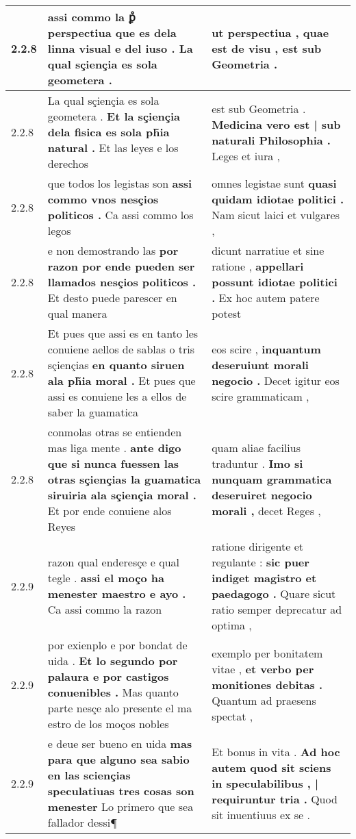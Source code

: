 \begin{tabular}{|p{1cm}|p{6.5cm}|p{6.5cm}|}
2.2.8 & assi commo la ꝑ̊ perspectiua \textbf{ que es dela linna visual e del iuso . } La qual sçiençia es sola geometera . & ut perspectiua , \textbf{ quae est de visu , } est sub Geometria . \\\hline
2.2.8 & La qual sçiençia es sola geometera . \textbf{ Et la sçiençia dela fisica es sola ph̃ia natural . } Et las leyes e los derechos & est sub Geometria . \textbf{ Medicina vero est | sub naturali Philosophia . } Leges et iura , \\\hline
2.2.8 & que todos los legistas son \textbf{ assi commo vnos nesçios politicos . } Ca assi commo los legos & omnes legistae sunt \textbf{ quasi quidam idiotae politici . } Nam sicut laici et vulgares , \\\hline
2.2.8 & e non demostrando las \textbf{ por razon por ende pueden ser llamados nesçios politicos . } Et desto puede parescer en qual manera & dicunt narratiue et sine ratione , \textbf{ appellari possunt idiotae politici . } Ex hoc autem patere potest \\\hline
2.2.8 & Et pues que assi es en tanto les conuiene aellos de sablas o tris sçiençias \textbf{ en quanto siruen ala ph̃ia moral . } Et pues que assi es conuiene les a ellos de saber la guamatica & eos scire , \textbf{ inquantum deseruiunt morali negocio . } Decet igitur eos scire grammaticam , \\\hline
2.2.8 & conmolas otras se entienden mas liga mente . \textbf{ ante digo que si nunca fuessen las otras sçiençias la guamatica siruiria ala sçiençia moral . } Et por ende conuiene alos Reyes & quam aliae facilius traduntur . \textbf{ Imo si nunquam grammatica deseruiret negocio morali , } decet Reges , \\\hline
2.2.9 & razon qual enderesçe e qual tegle . \textbf{ assi el moço ha menester maestro e ayo . } Ca assi commo la razon & ratione dirigente et regulante : \textbf{ sic puer indiget magistro et paedagogo . } Quare sicut ratio semper deprecatur ad optima , \\\hline
2.2.9 & por exienplo e por bondat de uida . \textbf{ Et lo segundo por palaura e por castigos conuenibles . } Mas quanto parte nesçe alo presente el ma estro de los moços nobles & exemplo per bonitatem vitae , \textbf{ et verbo per monitiones debitas . } Quantum ad praesens spectat , \\\hline
2.2.9 & e deue ser bueno en uida \textbf{ mas para que alguno sea sabio en las sciençias speculatiuas tres cosas son menester } Lo primero que sea fallador dessi¶ & Et bonus in vita . \textbf{ Ad hoc autem quod sit sciens in speculabilibus , | requiruntur tria . } Quod sit inuentiuus ex se . \\\hline

\end{tabular}
